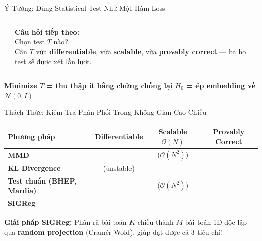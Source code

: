 \documentclass[aspectratio=169,9pt]{beamer}
\newcommand{\cmark}{\ding{51}}
\newcommand{\xmark}{\ding{55}}
\newcommand{\takeaway}[1]{%
  \vfill
  \begin{mdframed}[
    linecolor=maccent, linewidth=1.5pt,
    backgroundcolor=mlightgold,
    innertopmargin=5pt, innerbottommargin=5pt,
    innerleftmargin=10pt, innerrightmargin=10pt,
    roundcorner=3pt, skipabove=4pt, skipbelow=0pt
  ]
  \centering\small\bfseries\color{mprimary} #1
  \end{mdframed}%
}
\begin{document}
\begin{frame}{Ý Tưởng: Dùng Statistical Test Như Một Hàm Loss}
\begin{columns}[T]
\begin{center}
\end{center}


\begin{goodbox}
\footnotesize \textbf{Câu hỏi tiếp theo:}\\[4pt]
Chọn test $T$ nào?\\[4pt]
Cần $T$ vừa \textbf{differentiable}, vừa \textbf{scalable}, vừa \textbf{provably correct} — ba họ test sẽ được xét lần lượt.
\end{goodbox}

\end{columns}

\takeaway{Minimize $T$ = thu thập ít bằng chứng chống lại $H_0$ = ép embedding về $\mathcal{N}(0,I)$}

\end{frame}


\begin{frame}{Thách Thức: Kiểm Tra Phân Phối Trong Không Gian Cao Chiều}

\vspace{1em}
\begin{center}
\renewcommand{\arraystretch}{1.8}
\begin{tabular}{@{} l c c c @{}}
\toprule
\textbf{Phương pháp} & \textbf{Differentiable} & \textbf{Scalable} $\mathcal{O}(N)$ & \textbf{Provably Correct} \\
\midrule
\textbf{MMD} & \textcolor{mgood}{\cmark} & \textcolor{mbad}{\xmark} \footnotesize ($\mathcal{O}(N^2)$) & \textcolor{mgood}{\cmark} \\
\textbf{KL Divergence} & \textcolor{mbad}{\xmark} \footnotesize (unstable) & \textcolor{mgood}{\cmark} & \textcolor{mgood}{\cmark} \\
\textbf{Test chuẩn (BHEP, Mardia)} & \textcolor{mgood}{\cmark} & \textcolor{mbad}{\xmark} \footnotesize ($\mathcal{O}(N^2)$) & \textcolor{mgood}{\cmark} \\
\midrule
\rowcolor{mgood!15}
\textbf{SIGReg} & \textcolor{mgood}{\textbf{\cmark}} & \textcolor{mgood}{\textbf{\cmark}} & \textcolor{mgood}{\textbf{\cmark}} \\
\bottomrule
\end{tabular}
\end{center}

\vspace{1.5em}
\begin{accentbox}
\footnotesize \textbf{Giải pháp SIGReg:} Phân rã bài toán $K$-chiều thành $M$ bài toán 1D độc lập qua \textbf{random projection} (Cramér-Wold), giúp đạt được cả 3 tiêu chí!
\end{accentbox}

\end{frame}
\end{document}
